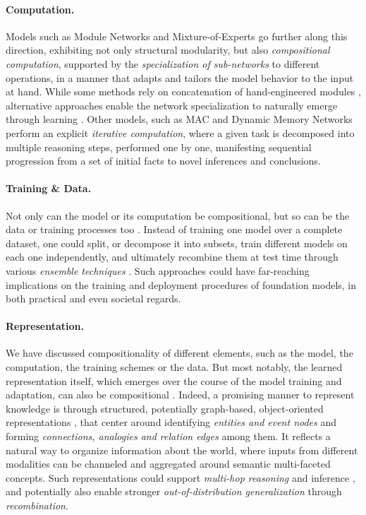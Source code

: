 \paragraph{Computation.}
Models such as Module Networks \citep{nmn} and Mixture-of-Experts \citep{moe} go further along this direction, exhibiting not only structural modularity, but also \textit{compositional computation}, supported by the \textit{specialization of sub-networks} to different operations, in a manner that adapts and tailors the model behavior to the input at hand. While some methods rely on concatenation of hand-engineered modules \citep{nmn}, alternative approaches  enable the network specialization to naturally emerge through learning \citep{moe}. Other models, such as MAC \citep{mac} and Dynamic Memory Networks \citep{dmn} perform an explicit \textit{iterative computation}, where a given task is decomposed into multiple reasoning steps, performed one by one, manifesting sequential progression from a set of initial facts to novel inferences and conclusions.

\paragraph{Training \& Data.} Not only can the model or its computation be compositional, but so can be the data or training processes too \citep{andreas2019good}. Instead of training one model over a complete dataset, one could split, or decompose it into subsets, train different models on each one independently, and ultimately recombine them at test time through various \textit{ensemble techniques} \citep{ensemble}. Such approaches could have far-reaching implications on the training and deployment procedures of foundation models, in both practical and even societal regards.

\paragraph{Representation.} 
We have discussed compositionality of different elements, such as the model, the computation, the training schemes or the data. But most notably, the learned representation itself, which emerges over the course of the model training and adaptation, can also be compositional \citep{andreas2019measuring}. Indeed, a promising manner to represent knowledge is through structured, potentially graph-based, object-oriented representations \citep{Zhang2019ERNIEEL,kepler}, that center around identifying \textit{entities and event nodes} and forming \textit{connections, analogies and relation edges} among them. It reflects a natural way to organize information about the world, where inputs from different modalities can be channeled and aggregated around semantic multi-faceted concepts. Such representations could support \textit{multi-hop reasoning} and inference \citep{kbert, colake, jaket}, and potentially also enable stronger \textit{out-of-distribution generalization} through \textit{recombination}. 

